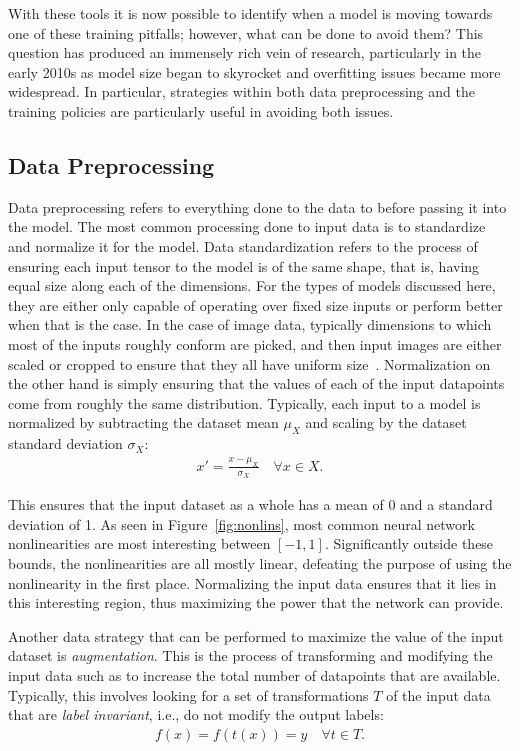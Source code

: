 With these tools it is now possible to identify when a model is moving towards one of these training pitfalls; however,
what can be done to avoid them? This question has produced an immensely rich vein of research,
particularly in the early 2010s as model size began to skyrocket and overfitting issues became more widespread. In particular, strategies
within both data preprocessing and the training policies are particularly useful in avoiding both issues.

\subsection{Data Preprocessing}
Data preprocessing refers to everything done to the data to before passing it into the model. The most common processing
done to input data is to standardize and normalize it for the model. Data standardization refers to the process of
ensuring each input tensor to the model is of the same shape, that is, having equal size along each of the dimensions.
For the types of models discussed here, they are either only capable of operating over fixed size inputs or perform
better when that is the case. In the case of image data, typically dimensions to which most of the inputs
roughly conform are picked, and then input images are either scaled or cropped to ensure that they all have uniform
size~\citep{kriv2012}. Normalization on the other hand is simply ensuring that the values of each of the input datapoints
come from roughly the same distribution. Typically, each input to a model is normalized by subtracting the dataset mean $\mu_X$
and scaling by the dataset standard deviation $\sigma_X$:
\begin{align}
	x' = \frac{x - \mu_X}{\sigma_X} \quad \forall x \in X.
\end{align}

This ensures that the input dataset as a whole has a mean of 0 and a standard deviation of 1. As seen in
Figure~\ref{fig:nonlins}, most common neural network nonlinearities are most interesting between $[-1, 1]$. Significantly
outside these bounds, the nonlinearities are all mostly linear, defeating the purpose of using the nonlinearity in the first
place. Normalizing the input data ensures that it lies in this interesting region, thus maximizing the power that the
network can provide.

Another data strategy that can be performed to maximize the value of the input dataset is \textit{augmentation}. This is the
process of transforming and modifying the input data such as to increase the total number of datapoints that are available.
Typically, this involves looking for a set of transformations $T$ of the input data that are
\textit{label invariant}, i.e., do not modify the output labels:
\begin{align}
	f(x) = f(t(x)) = y \quad \forall t \in T.
\end{align}

